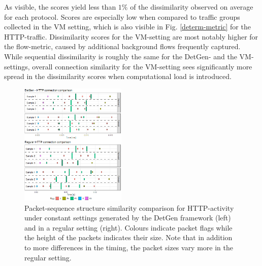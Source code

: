 \documentclass[sigconf]{acmart}
\begin{document}
As visible, the scores yield less than $1\%$ of the dissimilarity observed on average for each protocol. Scores are especially low when compared to traffic groups collected in the VM setting, which is also visible in Fig. \ref{determ-metric} for the HTTP-traffic. Dissimilarity scores for the VM-setting are most notably higher for the flow-metric, caused by additional background flows frequently captured. While sequential dissimilarity is roughly the same for the DetGen- and the VM-settings, overall connection similarity for the VM-setting sees significantly more spread in the dissimilarity scores when computational load is introduced.





\begin{figure}
\centering
\includegraphics[width=0.45\textwidth]{images/HTTP_comp_crop.png}
\caption{Packet-sequence structure similarity comparison for HTTP-activity under constant settings generated by the DetGen framework (left) and in a regular setting (right). Colours indicate packet flags while the height of the packets indicates their size. Note that in addition to more differences in the timing, the packet sizes vary more in the regular setting. }
\end{figure}
\end{document}
